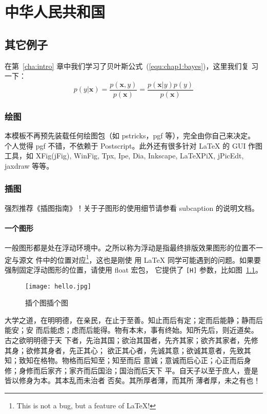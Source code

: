 \chapter{中华人民共和国}
\label{cha:china}

\section{其它例子}
\label{sec:other}

在第~\ref{cha:intro} 章中我们学习了贝叶斯公式~(\ref{equ:chap1:bayes})，这里我们复
习一下：
\begin{equation}
\label{equ:chap2:bayes}
p(y|\mathbf{x}) = \frac{p(\mathbf{x},y)}{p(\mathbf{x})}=
\frac{p(\mathbf{x}|y)p(y)}{p(\mathbf{x})}
\end{equation}

\subsection{绘图}
\label{sec:draw}

本模板不再预先装载任何绘图包（如 \textsf{pstricks，pgf} 等），完全由你自己来决定。
个人觉得 \textsf{pgf} 不错，不依赖于 Postscript。此外还有很多针对 \LaTeX{} 的
 GUI 作图工具，如 XFig(jFig), WinFig, Tpx, Ipe, Dia, Inkscape, LaTeXPiX,
jPicEdt, jaxdraw 等等。

\subsection{插图}
\label{sec:graphs}

强烈推荐《\LaTeXe 插图指南》！关于子图形的使用细节请参看 \textsf{subcaption} 的说明文档。

\subsubsection{一个图形}
\label{sec:onefig}
一般图形都是处在浮动环境中。之所以称为浮动是指最终排版效果图形的位置不一定与源文
件中的位置对应\footnote{This is not a bug, but a feature of
\LaTeX!}，这也是刚使 用 \LaTeX{}
同学可能遇到的问题。如果要强制固定浮动图形的位置，请使用
\textsf{float} 宏包， 它提供了 \texttt{[H]}
参数，比如图~\ref{fig:heythere}。
\begin{figure}[H] %
  \centering
  \texttt{[image: hello.jpg]}
  \caption{插个图插个图}
  \label{fig:heythere}
\end{figure}

大学之道，在明明德，在亲民，在止于至善。知止而后有定；定而后能静；静而后能安；安
而后能虑；虑而后能得。物有本末，事有终始。知所先后，则近道矣。古之欲明明德于天
下者，先治其国；欲治其国者，先齐其家；欲齐其家者，先修其身；欲修其身者，先正其心；
欲正其心者，先诚其意；欲诚其意者，先致其知；致知在格物。物格而后知至；知至而后
意诚；意诚而后心正；心正而后身 修；身修而后家齐；家齐而后国治；国治而后天下
平。自天子以至于庶人，壹是皆以修身为本。其本乱而未治者 否矣。其所厚者薄，而其所
薄者厚，未之有也！

